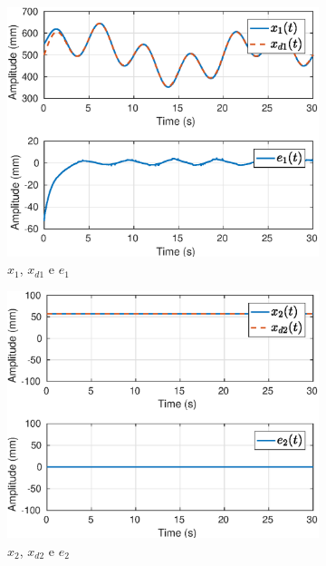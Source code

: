 \begin{figure}[H]
\centering
\begin{subfigure}{.5\textwidth}
  \centering
  \includegraphics[width=\linewidth]{./img/traj_1_k1/x1.eps}
  \caption{$x_1$, $x_{d1}$ e $e_1$}
  \label{fig:sub1}
\end{subfigure}%
\begin{subfigure}{.5\textwidth}
  \centering
  \includegraphics[width=\linewidth]{./img/traj_1_k1/x2.eps}
  \caption{$x_2$, $x_{d2}$ e $e_2$}
  \label{fig:sub2}
\end{subfigure}
\begin{subfigure}{.5\textwidth}

\end{subfigure}
\end{figure}
